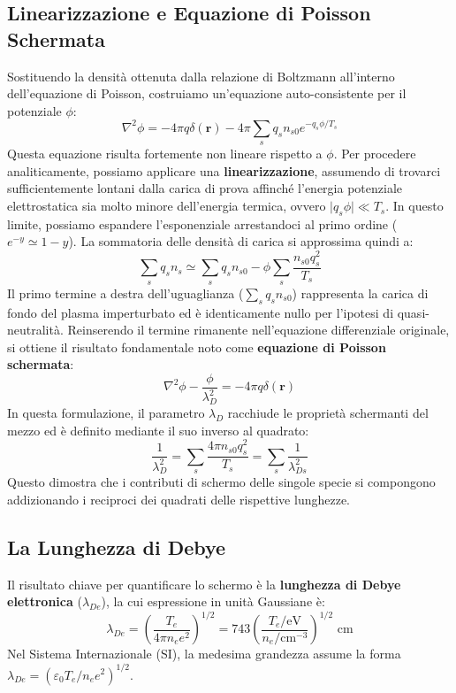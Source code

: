 \subsection{Linearizzazione e Equazione di Poisson Schermata}
Sostituendo la densità ottenuta dalla relazione di Boltzmann all'interno dell'equazione di Poisson, costruiamo un'equazione auto-consistente per il potenziale $\phi$:
\begin{equation}
\nabla^2 \phi = -4\pi q \delta(\mathbf{r}) - 4\pi \sum_s q_s n_{s0} e^{-q_s \phi / T_s}
\end{equation}
Questa equazione risulta fortemente non lineare rispetto a $\phi$. Per procedere analiticamente, possiamo applicare una \textbf{linearizzazione}, assumendo di trovarci sufficientemente lontani dalla carica di prova affinché l'energia potenziale elettrostatica sia molto minore dell'energia termica, ovvero $\vert{}q_s \phi\vert{} \ll T_s$. In questo limite, possiamo espandere l'esponenziale arrestandoci al primo ordine ($e^{-y} \simeq 1 - y$). La sommatoria delle densità di carica si approssima quindi a:
\begin{equation}
\sum_s q_s n_s \simeq \sum_s q_s n_{s0} - \phi \sum_s \frac{n_{s0} q_s^2}{T_s}
\end{equation}
Il primo termine a destra dell'uguaglianza ($\sum_s q_s n_{s0}$) rappresenta la carica di fondo del plasma imperturbato ed è identicamente nullo per l'ipotesi di quasi-neutralità. Reinserendo il termine rimanente nell'equazione differenziale originale, si ottiene il risultato fondamentale noto come \textbf{equazione di Poisson schermata}:
\begin{equation}
\nabla^2 \phi - \frac{\phi}{\lambda_D^2} = -4\pi q \delta(\mathbf{r})
\end{equation}
In questa formulazione, il parametro $\lambda_D$ racchiude le proprietà schermanti del mezzo ed è definito mediante il suo inverso al quadrato:
\begin{equation}
\frac{1}{\lambda_D^2} = \sum_s \frac{4\pi n_{s0} q_s^2}{T_s} = \sum_s \frac{1}{\lambda_{Ds}^2}
\end{equation}
Questo dimostra che i contributi di schermo delle singole specie si compongono addizionando i reciproci dei quadrati delle rispettive lunghezze.

\subsection{La Lunghezza di Debye}
Il risultato chiave per quantificare lo schermo è la \textbf{lunghezza di Debye elettronica} ($\lambda_{De}$), la cui espressione in unità Gaussiane è:
\begin{equation}
\lambda_{De} = \left( \frac{T_e}{4\pi n_e e^2} \right)^{1/2} = 743 \left( \frac{T_e / \text{eV}}{n_e / \text{cm}^{-3}} \right)^{1/2} \text{ cm}
\end{equation}
Nel Sistema Internazionale (SI), la medesima grandezza assume la forma $\lambda_{De} = (\varepsilon_0 T_e / n_e e^2)^{1/2}$.

